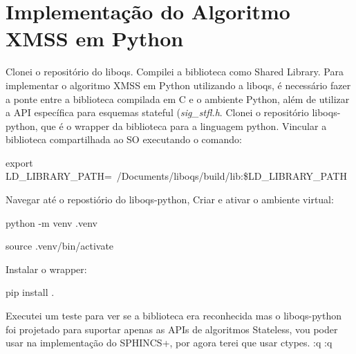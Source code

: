 \chapter{Implementação do Algoritmo XMSS em Python}

Clonei o repositório do liboqs. Compilei a biblioteca como Shared Library.
Para implementar o algoritmo XMSS em Python utilizando a liboqs, é necessário fazer a ponte entre a biblioteca compilada em C e o ambiente Python, além de utilizar a API específica para esquemas stateful (\textit{sig\_stfl.h}. Clonei o repositório liboqs-python, que é o wrapper da biblioteca para a linguagem python. Vincular a biblioteca compartilhada ao SO executando o comando:

export LD\_LIBRARY\_PATH=~/Documents/liboqs/build/lib:\$LD\_LIBRARY\_PATH

Navegar até o repostiório do liboqs-python, Criar e ativar o ambiente virtual:

python -m venv .venv

source .venv/bin/activate

Instalar o wrapper:

pip install .


Executei um teste para ver se a biblioteca era reconhecida mas o liboqs-python foi projetado para suportar apenas as APIs de algoritmos Stateless, vou poder usar na implementação do SPHINCS+, por agora terei que usar ctypes.
:q
:q

